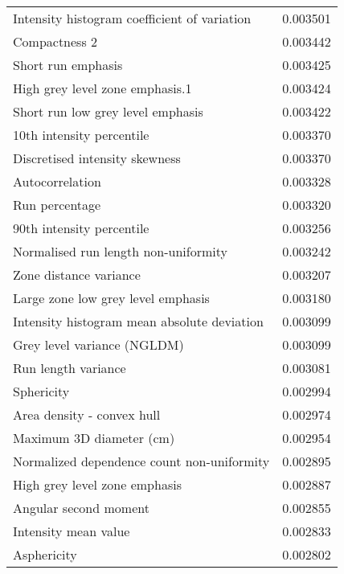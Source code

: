 \begin{longtable}{|lr|}
Intensity histogram coefficient of variation       &        0.003501 \\
Compactness 2                                      &        0.003442 \\
Short run emphasis                                 &        0.003425 \\
High grey level zone emphasis.1                    &        0.003424 \\
Short run low grey level emphasis                  &        0.003422 \\
10th intensity percentile                          &        0.003370 \\
Discretised intensity skewness                     &        0.003370 \\
Autocorrelation                                    &        0.003328 \\
Run percentage                                     &        0.003320 \\
90th intensity percentile                          &        0.003256 \\
Normalised run length non-uniformity               &        0.003242 \\
Zone distance variance                             &        0.003207 \\
Large zone low grey level emphasis                 &        0.003180 \\
Intensity histogram mean absolute deviation        &        0.003099 \\
Grey level variance (NGLDM)                        &        0.003099 \\
Run length variance                                &        0.003081 \\
Sphericity                                         &        0.002994 \\
Area density - convex hull                         &        0.002974 \\
Maximum 3D diameter (cm)                           &        0.002954 \\
Normalized dependence count non-uniformity         &        0.002895 \\
High grey level zone emphasis                      &        0.002887 \\
Angular second moment                              &        0.002855 \\
Intensity mean value                               &        0.002833 \\
Asphericity                                        &        0.002802 \\

\end{longtable}
